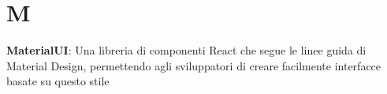 \section{M}
\textbf{MaterialUI}: Una libreria di componenti React che segue le linee guida di Material Design, permettendo agli sviluppatori di creare facilmente interfacce basate su questo stile\\